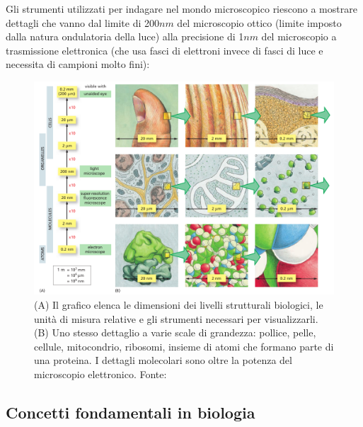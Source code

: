 \par Gli strumenti utilizzati per indagare nel mondo microscopico riescono a mostrare dettagli che vanno dal limite di 200$nm$ del microscopio ottico (limite imposto dalla natura ondulatoria della luce) alla precisione di 1$nm$ del microscopio a trasmissione elettronica (che usa fasci di elettroni invece di fasci di luce e necessita di campioni molto fini):

\begin{figure}[!h]
	\centering
	\includegraphics[scale=0.6]{images/grandezze.png}
	\caption{(A) Il grafico elenca le dimensioni dei livelli strutturali biologici, le unità di misura relative e gli strumenti necessari per visualizzarli. (B) Uno stesso dettaglio a varie scale di grandezza: pollice, pelle, cellule, mitocondrio, ribosomi, insieme di atomi che formano parte di una proteina. I dettagli molecolari sono oltre la potenza del microscopio elettronico. Fonte: \cite{alberts2018essential}}
	\label{fig:microscopi-grandezze}
\end{figure}

\subsection{Concetti fondamentali in biologia}

